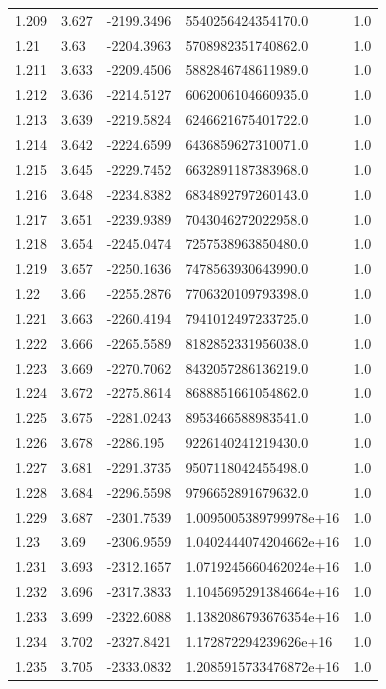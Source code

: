 \begin{tabular}{lllll}
1.209 & 3.627 & -2199.3496 & 5540256424354170.0 & 1.0 \\
1.21 & 3.63 & -2204.3963 & 5708982351740862.0 & 1.0 \\
1.211 & 3.633 & -2209.4506 & 5882846748611989.0 & 1.0 \\
1.212 & 3.636 & -2214.5127 & 6062006104660935.0 & 1.0 \\
1.213 & 3.639 & -2219.5824 & 6246621675401722.0 & 1.0 \\
1.214 & 3.642 & -2224.6599 & 6436859627310071.0 & 1.0 \\
1.215 & 3.645 & -2229.7452 & 6632891187383968.0 & 1.0 \\
1.216 & 3.648 & -2234.8382 & 6834892797260143.0 & 1.0 \\
1.217 & 3.651 & -2239.9389 & 7043046272022958.0 & 1.0 \\
1.218 & 3.654 & -2245.0474 & 7257538963850480.0 & 1.0 \\
1.219 & 3.657 & -2250.1636 & 7478563930643990.0 & 1.0 \\
1.22 & 3.66 & -2255.2876 & 7706320109793398.0 & 1.0 \\
1.221 & 3.663 & -2260.4194 & 7941012497233725.0 & 1.0 \\
1.222 & 3.666 & -2265.5589 & 8182852331956038.0 & 1.0 \\
1.223 & 3.669 & -2270.7062 & 8432057286136219.0 & 1.0 \\
1.224 & 3.672 & -2275.8614 & 8688851661054862.0 & 1.0 \\
1.225 & 3.675 & -2281.0243 & 8953466588983541.0 & 1.0 \\
1.226 & 3.678 & -2286.195 & 9226140241219430.0 & 1.0 \\
1.227 & 3.681 & -2291.3735 & 9507118042455498.0 & 1.0 \\
1.228 & 3.684 & -2296.5598 & 9796652891679632.0 & 1.0 \\
1.229 & 3.687 & -2301.7539 & 1.0095005389799978e+16 & 1.0 \\
1.23 & 3.69 & -2306.9559 & 1.0402444074204662e+16 & 1.0 \\
1.231 & 3.693 & -2312.1657 & 1.0719245660462024e+16 & 1.0 \\
1.232 & 3.696 & -2317.3833 & 1.1045695291384664e+16 & 1.0 \\
1.233 & 3.699 & -2322.6088 & 1.1382086793676354e+16 & 1.0 \\
1.234 & 3.702 & -2327.8421 & 1.172872294239626e+16 & 1.0 \\
1.235 & 3.705 & -2333.0832 & 1.2085915733476872e+16 & 1.0 \\

\end{tabular}
